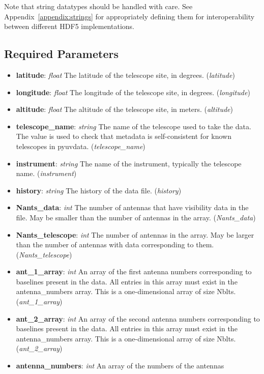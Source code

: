 \documentclass[11pt, oneside]{article}
\begin{document}
Note that string datatypes should be handled with care. See
Appendix~\ref{appendix:strings} for appropriately defining them for
interoperability between different HDF5 implementations.

\subsection{Required Parameters}
\label{sec:req_params}
\begin{itemize}
\item \textbf{latitude}: \textit{float} The latitude of the telescope site, in
  degrees. (\textit{latitude})
\item \textbf{longitude}: \textit{float} The longitude of the telescope site, in
  degrees. (\textit{longitude})
\item \textbf{altitude}: \textit{float} The altitude of the telescope site, in
  meters. (\textit{altitude})
\item \textbf{telescope\_name}: \textit{string} The name of the telescope used
  to take the data. The value is used to check that metadata is self-consistent
  for known telescopes in pyuvdata. (\textit{telescope\_name})
\item \textbf{instrument}: \textit{string} The name of the instrument, typically
  the telescope name. (\textit{instrument})
\item \textbf{history}: \textit{string} The history of the data
  file. (\textit{history})
\item \textbf{Nants\_data}: \textit{int} The number of antennas that have
  visibility data in the file. May be smaller than the number of antennas in the
  array. (\textit{Nants\_data})
\item \textbf{Nants\_telescope}: \textit{int} The number of antennas in the
  array. May be larger than the number of antennas with data corresponding to
  them. (\textit{Nants\_telescope})
\item \textbf{ant\_1\_array}: \textit{int} An array of the first antenna numbers
  corresponding to baselines present in the data. All entries in this array must exist
  in the antenna\_numbers array. This is a one-dimensional
  array of size Nblts. (\textit{ant\_1\_array})
\item \textbf{ant\_2\_array}: \textit{int} An array of the second antenna numbers
  corresponding to baselines present in the data. All entries in this array must exist
  in the antenna\_numbers array. This is a one-dimensional
  array of size Nblts. (\textit{ant\_2\_array})
\item \textbf{antenna\_numbers}: \textit{int} An array of the numbers of the antennas

\end{itemize}
\end{document}
